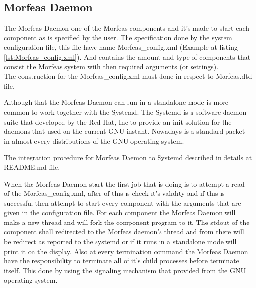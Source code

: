 \subsection{Morfeas Daemon}
The Morfeas Daemon one of the Morfeas components and it's made to start each component as is specified by the user.
The specification done by the system configuration file, this file have name Morfeas\_config.xml (Example at listing \ref{lst:Morfeas_config.xml}). 
And contains the amount and type of components that consist the Morfeas system with then required arguments (or settings).\\
The construction for the Morfeas\_config.xml must done in respect to Morfeas.dtd file.

Although that the Morfeas Daemon can run in a standalone mode is more common to work together with the Systemd. 
The Systemd is a software daemon suite that developed by the Red Hat, Inc to provide an init solution for the daemons that used on the current GNU instant.
Nowadays is a standard packet in almost every distributions of the GNU operating system.

The integration procedure for Morfeas Daemon to Systemd described in details at README.md file.

When the Morfeas Daemon start the first job that is doing is to attempt a read of the Morfeas\_config.xml, after of this is check it's validity and if this is successful then 
attempt to start every component with the arguments that are given in the configuration file. For each component the Morfeas Daemon will make a new thread and will fork the component program to it.
The stdout of the component shall redirected to the Morfeas daemon's thread and from there will be redirect as reported to the systemd or if it runs in a standalone mode will print it on the display.
Also at every termination command the Morfeas Daemon have the responsibility to terminate all of it's child processes before terminate itself. 
This done by using the signaling mechanism that provided from the GNU operating system.